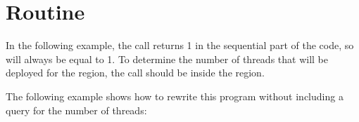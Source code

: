 \pagebreak
\section{ Routine}
\label{sec:get_nthrs}

In the following example, the  call returns 1 in 
the sequential part of the code, so  will always be equal to 1. To determine 
the number of threads that will be deployed for the  region, the 
call should be inside the  region.



\pagebreak
The following example shows how to rewrite this program without including a query 
for the number of threads:





